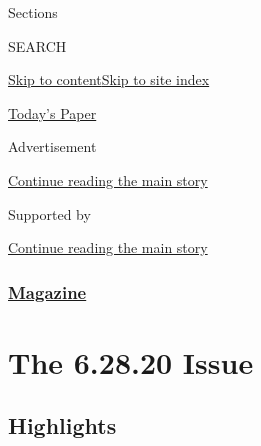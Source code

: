 Sections

SEARCH

\protect\hyperlink{site-content}{Skip to
content}\protect\hyperlink{site-index}{Skip to site index}

\href{https://myaccount.nytimes3xbfgragh.onion/auth/login?response_type=cookie\&client_id=vi}{}

\href{https://www.nytimes3xbfgragh.onion/section/todayspaper}{Today's
Paper}

Advertisement

\protect\hyperlink{after-top}{Continue reading the main story}

Supported by

\protect\hyperlink{after-sponsor}{Continue reading the main story}

\hypertarget{magazine}{%
\subsubsection{\texorpdfstring{\href{/section/magazine}{Magazine}}{Magazine}}\label{magazine}}

\hypertarget{the-62820-issue}{%
\section{The 6.28.20 Issue}\label{the-62820-issue}}

\hypertarget{highlights}{%
\subsection{Highlights}\label{highlights}}

